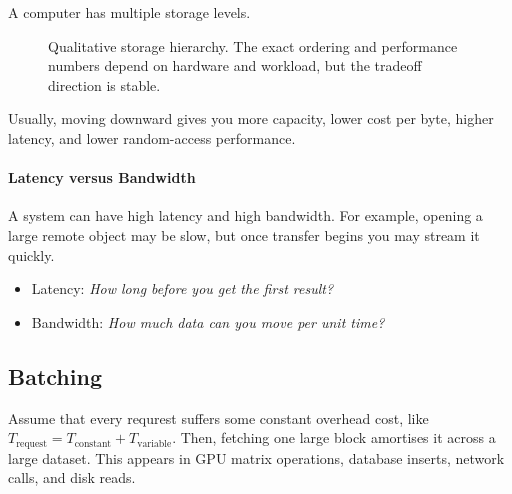 A computer has multiple storage levels.

\begin{figure}[htbp]
\centering
{}
\caption{Qualitative storage hierarchy. The exact ordering and performance numbers depend on hardware and workload, but the tradeoff direction is stable.}
\label{fig:storage-hierarchy}
\end{figure}

Usually, moving downward gives you more capacity, lower cost per byte, higher latency, and lower random-access performance.

\paragraph{Latency versus Bandwidth}
A system can have high latency and high bandwidth.
For example, opening a large remote object may be slow, but once transfer begins you may stream it quickly.
\begin{itemize}
    \item Latency: \textit{How long before you get the first result?}
    \item Bandwidth: \textit{How much data can you move per unit time?}
\end{itemize}


\subsection{Batching}
Assume that every requrest suffers some constant overhead cost, like $T_{\text{request}} = T_{\text{constant}} + T_{\text{variable}}$. 
Then, fetching one large block amortises it across a large dataset.
This appears in GPU matrix operations, database inserts, network calls, and disk reads.


